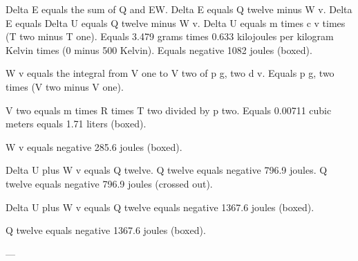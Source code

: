 Delta E equals the sum of Q and EW.  
Delta E equals Q twelve minus W v.  
Delta E equals Delta U equals Q twelve minus W v.  
Delta U equals m times c v times (T two minus T one).  
Equals 3.479 grams times 0.633 kilojoules per kilogram Kelvin times (0 minus 500 Kelvin).  
Equals negative 1082 joules (boxed).  

W v equals the integral from V one to V two of p g, two d v.  
Equals p g, two times (V two minus V one).  

V two equals m times R times T two divided by p two.  
Equals 0.00711 cubic meters equals 1.71 liters (boxed).  

W v equals negative 285.6 joules (boxed).  

Delta U plus W v equals Q twelve.  
Q twelve equals negative 796.9 joules.  
Q twelve equals negative 796.9 joules (crossed out).  

Delta U plus W v equals Q twelve equals negative 1367.6 joules (boxed).  

Q twelve equals negative 1367.6 joules (boxed).  

---